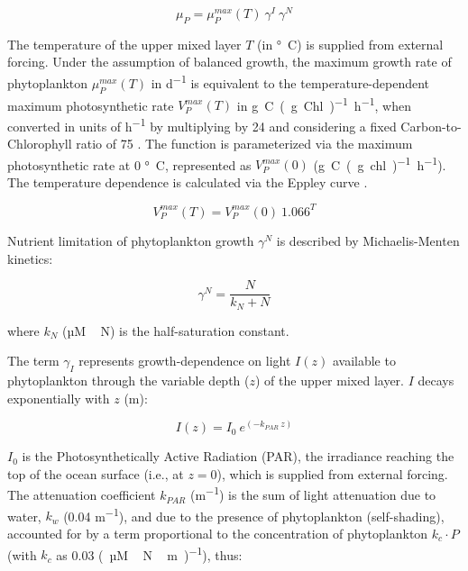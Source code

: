 \documentclass[journal abbreviation, manuscript]{copernicus}
\begin{document}
\begin{equation}
    \mu_{P} = \mu_P^{max}(T) \ \gamma^{I} \ \gamma^{N}
\end{equation}

The temperature of the upper mixed layer $T$ (in \unit{\degree C}) is supplied from external forcing. Under the assumption of balanced growth, the maximum growth rate of phytoplankton $\mu_P^{max}(T)$ in \unit{d^{−1}} is equivalent to the temperature-dependent maximum photosynthetic rate $V_P^{max}(T)$ in \unit{g C (g Chl)^{-1} h^{-1}}, when converted in units of \unit{h^{-1}} by multiplying by 24 and considering a fixed Carbon-to-Chlorophyll ratio of 75 \citep{Sathyendranath2009Carbon-to-chlorophyllSea}. The function is parameterized via the maximum photosynthetic rate at 0 \unit{\degree C}, represented as $V_P^{max}(0)$ (\unit{g C (g chl)^{-1} h^{-1}}). The temperature dependence is calculated via the Eppley curve \citep{Eppley1972TemperatureSea}.

\begin{equation}
    V_P^{max}(T) = V_P^{max}(0) \ 1.066^T
\end{equation}

Nutrient limitation of phytoplankton growth $\gamma^N$ is described by Michaelis-Menten kinetics:

\begin{equation}
    \gamma^N = \frac{N}{k_N + N}
\end{equation}

where $k_N$ (\unit{µM\,N}) is the half-saturation constant.

The term $\gamma_{I}$ represents growth-dependence on light $I(z)$ available to phytoplankton through the variable depth ($z$) of the upper mixed layer. $I$ decays exponentially with $z$ (\unit{m}):

\begin{equation}
    I(z) = I_{0} \ e^{(-k_{PAR} \ z)}
\label{EQ:lightatt}
\end{equation}

$I_{0}$ is the Photosynthetically Active Radiation (PAR), the irradiance reaching the top of the ocean surface (i.e., at $z=0$), which is supplied from external forcing. The attenuation coefficient $k_{PAR}$ (\unit{m^{-1}}) is the sum of light attenuation due to water, $k_w$ (0.04 \unit{m^{-1}}), and due to the presence of phytoplankton (self-shading), accounted for by a term proportional to the concentration of phytoplankton $k_c \cdot P$ (with $k_c$ as 0.03 \unit{(µM\,N\,m)^{-1}}), thus:
\end{document}
